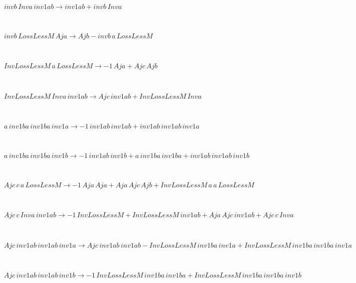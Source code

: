 \documentclass[rep10,leqno]{report}
\begin{document}
\begin{minipage}{6in}
$
invb\,
 Inva\,
 inv1ab\rightarrow inv1ab + invb\,
 Inva
$
\end{minipage}\medskip \\
\begin{minipage}{6in}
$
invb\,
 LossLessM\,
 Aja\rightarrow Ajb - invb\,
 a\,
 LossLessM
$
\end{minipage}\medskip \\
\begin{minipage}{6in}
$
InvLossLessM\,
 a\,
 LossLessM\rightarrow -1\,
 Aja + Ajc\,
 Ajb
$
\end{minipage}\medskip \\
\begin{minipage}{6in}
$
InvLossLessM\,
 Inva\,
 inv1ab\rightarrow Ajc\,
 inv1ab + InvLossLessM\,
 Inva
$
\end{minipage}\medskip \\
\begin{minipage}{6in}
$
a\,
 inv1ba\,
 inv1ba\,
 inv1a\rightarrow -1\,
 inv1ab\,
 inv1ab + inv1ab\,
 inv1ab\,
 inv1a
$
\end{minipage}\medskip \\
\begin{minipage}{6in}
$
a\,
 inv1ba\,
 inv1ba\,
 inv1b\rightarrow -1\,
 inv1ab\,
 inv1b + a\,
 inv1ba\,
 inv1ba + inv1ab\,
 inv1ab\,
 inv1b
$
\end{minipage}\medskip \\
\begin{minipage}{6in}
$
Ajc\,
 c\,
 a\,
 LossLessM\rightarrow -1\,
 Aja\,
 Aja + Aja\,
 Ajc\,
 Ajb + InvLossLessM\,
 a\,
 a\,
 LossLessM
$
\end{minipage}\medskip \\
\begin{minipage}{6in}
$
Ajc\,
 c\,
 Inva\,
 inv1ab\rightarrow -1\,
 InvLossLessM + InvLossLessM\,
 inv1ab + Aja\,
 Ajc\,
 inv1ab + Ajc\,
 c\,
 Inva
$
\end{minipage}\medskip \\
\begin{minipage}{6in}
$
Ajc\,
 inv1ab\,
 inv1ab\,
 inv1a\rightarrow Ajc\,
 inv1ab\,
 inv1ab - InvLossLessM\,
 inv1ba\,
 inv1a + InvLossLessM\,
 inv1ba\,
 inv1ba\,
 inv1a
$
\end{minipage}\medskip \\
\begin{minipage}{6in}
$
Ajc\,
 inv1ab\,
 inv1ab\,
 inv1b\rightarrow -1\,
 InvLossLessM\,
 inv1ba\,
 inv1ba + InvLossLessM\,
 inv1ba\,
 inv1ba\,
 inv1b
$
\end{minipage}\medskip \\
\end{document}
